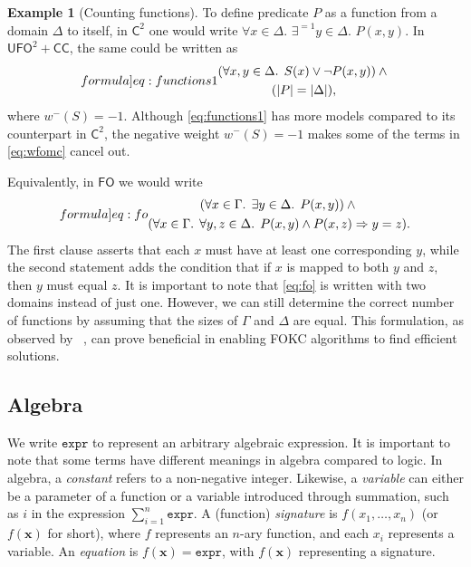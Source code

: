 \documentclass[letterpaper]{article} %
\theoremstyle{remark}
\theoremstyle{definition}
\newtheorem{example}{Example}
\newcommand{\expr}{\mathtt{expr}}
\newcommand{\Ctwo}{$\mathsf{C}^{2}$}
\newcommand{\FO}{$\mathsf{FO}$}
\newcommand{\UFO}{$\mathsf{UFO}^{2} + \mathsf{CC}$}
\begin{document}
\begin{example}[Counting functions]\label{example:functions}
  To define predicate $P$ as a function from a domain $\Delta$ to itself, in
  \Ctwo{} one would write $\forall x \in \Delta\text{.
  }\exists^{=1} y \in \Delta\text{. }P(x, y)$. In \UFO{}, the same could be
  written as
  \begin{equation}\label[formula]{eq:functions1}
    \begin{gathered}
      (\forall x, y \in \Delta\text{. }S(x) \lor \neg P(x, y)) \land{}\\
      (|P| = |\Delta|),
    \end{gathered}
  \end{equation}
  where $w^{-}(S) = -1$. Although \cref{eq:functions1} has more models compared
  to its counterpart in \Ctwo{}, the negative weight $w^{-}(S) = -1$ makes some
  of the terms in \cref{eq:wfomc} cancel out.

  Equivalently, in \FO{} we would write
  \begin{equation}\label[formula]{eq:fo}
    \begin{gathered}
      (\forall x \in \Gamma\text{. }\exists y \in \Delta\text{. }P(x, y)) \land{}\\
      (\forall x \in \Gamma\text{. }\forall y, z \in \Delta\text{. }P(x, y) \land P(x, z) \Rightarrow y = z).
    \end{gathered}
  \end{equation}
  The first clause asserts that each $x$ must have at least one corresponding
  $y$, while the second statement adds the condition that if $x$ is mapped to
  both $y$ and $z$, then $y$ must equal $z$. It is important to note that
  \cref{eq:fo} is written with two domains instead of just one. However, we can
  still determine the correct number of functions by assuming that the sizes of
  $\Gamma$ and $\Delta$ are equal. This formulation, as observed by
  \citeauthor{DBLP:conf/kr/DilkasB23}~, can
  prove beneficial in enabling FOKC algorithms to find efficient solutions.
\end{example}

\subsection{Algebra}\label{sec:algebra}

We write $\expr{}$ to represent an arbitrary algebraic expression. It is
important to note that some terms have different meanings in algebra compared to
logic. In algebra, a \emph{constant} refers to a non-negative integer. Likewise,
a \emph{variable} can either be a parameter of a function or a variable
introduced through summation, such as $i$ in the expression
$\sum_{i=1}^{n} \expr$. A (function) \emph{signature} is
$f(x_{1}, \dots, x_{n})$ (or $f(\mathbf{x})$ for short), where $f$ represents an
$n$-ary function, and each $x_{i}$ represents a variable. An \emph{equation} is
$f(\mathbf{x}) = \expr{}$, with $f(\mathbf{x})$ representing a signature.
\end{document}
